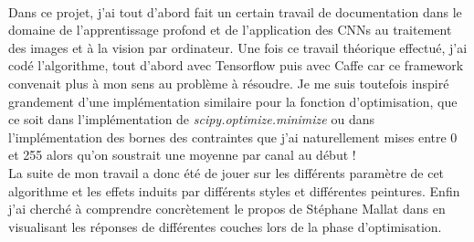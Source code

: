 \documentclass{article}
\begin{document}
\paragraph*{}
Dans ce projet, j'ai tout d'abord fait un certain travail de documentation dans le domaine de l'apprentissage profond et de l'application des CNNs au traitement des images et à la vision par ordinateur. Une fois ce travail théorique effectué, j'ai codé l'algorithme, tout d'abord avec Tensorflow puis avec Caffe car ce  framework convenait plus à mon sens au problème à résoudre. Je me suis toutefois inspiré grandement d'une implémentation similaire pour la fonction d'optimisation, que ce soit dans l'implémentation de \textit{scipy.optimize.minimize} ou dans l'implémentation des bornes des contraintes que j'ai naturellement mises entre 0 et 255 alors qu'on soustrait une moyenne par canal au début !\\
La suite de mon travail a donc été de jouer sur les différents paramètre de cet algorithme et les effets induits par différents styles et différentes peintures. Enfin j'ai cherché à comprendre concrètement le propos de Stéphane Mallat dans \cite{2016RSPTA.37450203M} en visualisant les réponses de différentes couches lors de la phase d'optimisation.
\end{document}
